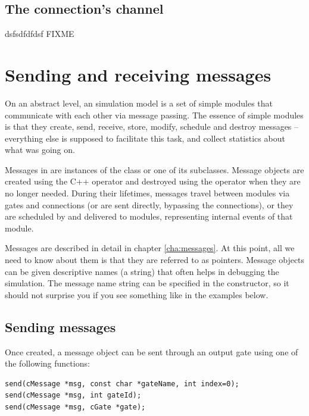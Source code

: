 \subsection{The connection's channel}

dsfsdfdfdsf
FIXME



\section{Sending and receiving messages}
\label{ch:simple-modules:sending-and-receiving}

On an abstract level, an {\opp} simulation model is a set of
simple modules that communicate with each other via message passing.
The essence of simple modules is that they create, send, receive,
store, modify, schedule and destroy messages -- everything else
is supposed to facilitate this task, and collect statistics
about what was going on.

Messages in {\opp} are instances of the  class or
one of its subclasses. Message objects are created using the C++
 operator and destroyed using the  operator
when they are no longer needed. During their lifetimes,
messages travel between modules via gates and connections
(or are sent directly, bypassing the connections), or
they are scheduled by and delivered to modules,
representing internal events of that module.

Messages are described in detail in chapter \ref{cha:messages}.
At this point, all we need to know about them is that they are
referred to as  pointers. Message objects
can be given descriptive names (a  string)
that often helps in debugging the simulation. The message
name string can be specified in the constructor, so it
should not surprise you if you see something like
 in the examples below.



\subsection{Sending messages}

Once created, a message object can be sent through an
output gate using one of the following functions:

\begin{verbatim}
send(cMessage *msg, const char *gateName, int index=0);
send(cMessage *msg, int gateId);
send(cMessage *msg, cGate *gate);
\end{verbatim}

